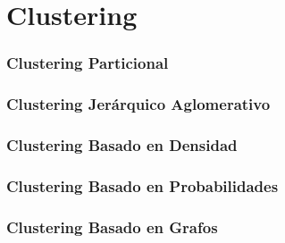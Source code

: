 \section{Clustering}\label{sec:clustering}

\begin{frame}
    \frametitle{Clustering Particional}

\end{frame}

\begin{frame}
    \frametitle{Clustering Jerárquico Aglomerativo}

\end{frame}

\begin{frame}
    \frametitle{Clustering Basado en Densidad}

\end{frame}

\begin{frame}
    \frametitle{Clustering Basado en Probabilidades}

\end{frame}

\begin{frame}
    \frametitle{Clustering Basado en Grafos}

\end{frame}